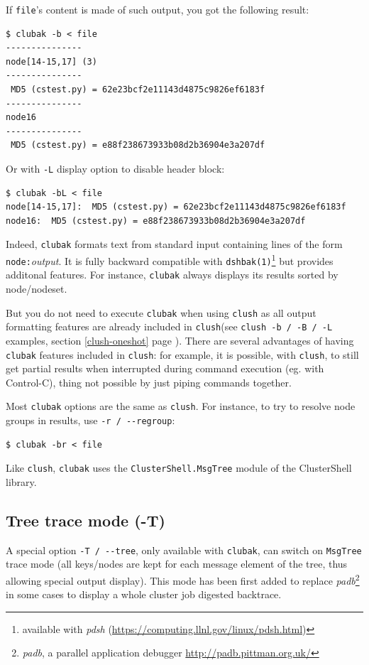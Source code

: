 \documentclass[english,a4paper]{csuserguide}
\newcommand{\clush}{\texttt{clush}\xspace}
\newcommand{\clubak}{\texttt{clubak}\xspace}
\begin{document}
If \verb+file+'s content is made of such output, you got the following result:
\medskip
\begin{lstlisting}[breaklines=true, breakatwhitespace=true]
$ clubak -b < file 
---------------
node[14-15,17] (3)
---------------
 MD5 (cstest.py) = 62e23bcf2e11143d4875c9826ef6183f
---------------
node16
---------------
 MD5 (cstest.py) = e88f238673933b08d2b36904e3a207df
\end{lstlisting}

Or with \verb+-L+ display option to disable header block:
\medskip
\begin{lstlisting}[breaklines=true, breakatwhitespace=true]
$ clubak -bL < file
node[14-15,17]:  MD5 (cstest.py) = 62e23bcf2e11143d4875c9826ef6183f
node16:  MD5 (cstest.py) = e88f238673933b08d2b36904e3a207df
\end{lstlisting}

Indeed, \clubak formats text from standard input containing lines of the form \verb+node:+\textit{output}.  It is fully backward compatible with \verb+dshbak(1)+\footnote{available with \textit{pdsh} (\url{https://computing.llnl.gov/linux/pdsh.html})} but provides additonal features.  For instance, \clubak always displays its results sorted by node/nodeset.

But you do not need to execute \clubak when using \clush as all output formatting features are already included in \clush (see \verb+clush -b / -B / -L+ examples, section \ref{clush-oneshot} page \pageref{clush-oneshot}). There are several advantages of having \clubak features included in \clush: for example, it is possible, with \clush, to still get partial results when interrupted during command execution (eg. with Control-C), thing not possible by just piping commands together.

Most \clubak options are the same as \clush. For instance, to try to resolve node groups in results, use \verb+-r / --regroup+:
\medskip
\begin{lstlisting}[breaklines=true, breakatwhitespace=true]
$ clubak -br < file 
\end{lstlisting}

Like \clush, \clubak uses the \verb+ClusterShell.MsgTree+ module of the ClusterShell library.

\subsection{Tree trace mode (-T)}
A special option \verb+-T / --tree+, only available with \clubak, can switch on \verb+MsgTree+ trace mode (all keys/nodes are kept for each message element of the tree, thus allowing special output display). This mode has been first added to replace \textit{padb}\footnote{\textit{padb}, a parallel application debugger \url{http://padb.pittman.org.uk/}} in some cases to display a whole cluster job digested backtrace.
\end{document}
